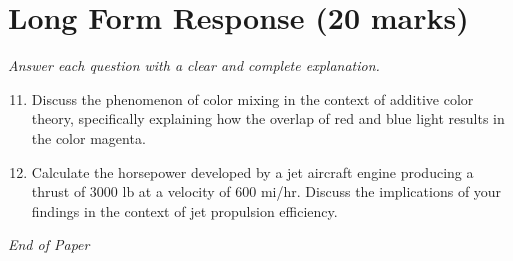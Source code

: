 \documentclass[12pt]{article}
\begin{document}
\section*{Long Form Response (20 marks)}
\textit{Answer each question with a clear and complete explanation.}
\begin{enumerate}[label=\arabic*.]
\setcounter{enumi}{10}
\item Discuss the phenomenon of color mixing in the context of additive color theory, specifically explaining how the overlap of red and blue light results in the color magenta.
\item Calculate the horsepower developed by a jet aircraft engine producing a thrust of 3000 lb at a velocity of 600 mi/hr. Discuss the implications of your findings in the context of jet propulsion efficiency.
\end{enumerate}

\vfill
\noindent\textit{End of Paper}
\end{document}
